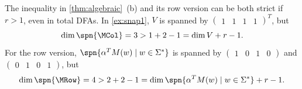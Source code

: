 \begin{rem}
The inequality in \autoref{thm:algebraic}~(b) and its row version can be both strict if $r>1$, even in total DFAs. In \autoref{ex:snap1}, $V$ is spanned by $\begin{pmatrix} 1 & 1 & 1 & 1\end{pmatrix}^T$, but 
\[\dim \spn{\MCol} = 3 > 1 + 2 - 1 = \dim V + r-1.\]
For the row version, $\spn{\alpha^T M(w) \mid w \in \Sigma^*}$ is spanned by 
$\begin{pmatrix}1 & 0 & 1 & 0\end{pmatrix}$ and
$\begin{pmatrix}0 & 1 & 0 & 1\end{pmatrix}$, but 
\[\dim \spn{\MRow} = 4 > 2 + 2 - 1 = \dim \spn{\alpha^T M(w) \mid w \in \Sigma^*} + r - 1.\]
\end{rem}
